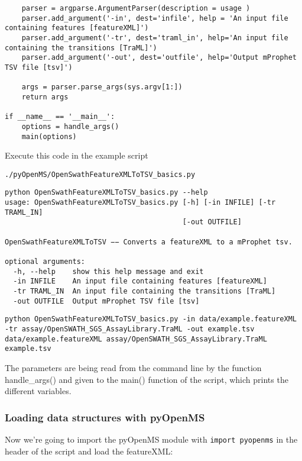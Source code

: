 {\begin{lstlisting}
    parser = argparse.ArgumentParser(description = usage )
    parser.add_argument('-in', dest='infile', help = 'An input file containing features [featureXML]')
    parser.add_argument('-tr', dest='traml_in', help='An input file containing the transitions [TraML]')
    parser.add_argument('-out', dest='outfile', help='Output mProphet TSV file [tsv]')

    args = parser.parse_args(sys.argv[1:])
    return args

if __name__ == '__main__':
    options = handle_args()
    main(options)
\end{lstlisting}

Execute this code in the example script

\begin{center}
\texttt{./pyOpenMS/OpenSwathFeatureXMLToTSV\_basics.py}
\end{center}

\begin{lstlisting}
python OpenSwathFeatureXMLToTSV_basics.py --help
usage: OpenSwathFeatureXMLToTSV_basics.py [-h] [-in INFILE] [-tr TRAML_IN]
                                          [-out OUTFILE]

OpenSwathFeatureXMLToTSV −− Converts a featureXML to a mProphet tsv.

optional arguments:
  -h, --help    show this help message and exit
  -in INFILE    An input file containing features [featureXML]
  -tr TRAML_IN  An input file containing the transitions [TraML]
  -out OUTFILE  Output mProphet TSV file [tsv]
\end{lstlisting}

\begin{lstlisting}
python OpenSwathFeatureXMLToTSV_basics.py -in data/example.featureXML -tr assay/OpenSWATH_SGS_AssayLibrary.TraML -out example.tsv  
data/example.featureXML assay/OpenSWATH_SGS_AssayLibrary.TraML example.tsv
\end{lstlisting}

The parameters are being read from the command line by the function handle\_args() and given to the main() function of the script, which prints the different variables.

\subsubsection{Loading data structures with pyOpenMS}
Now we're going to import the pyOpenMS module with \texttt{import pyopenms} in the header of the script and load the featureXML:

}

